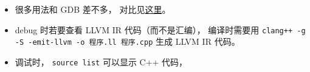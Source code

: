 
\begin{issues}
\issueDraft
\end{issues}


\begin{itemize}
\item 很多用法和 GDB 差不多， 对比见\href{https://lldb.llvm.org/use/map.html}{这里}。
\item debug 时若要查看 LLVM IR 代码（而不是汇编）， 编译时需要用 \verb|clang++ -g -S -emit-llvm -o 程序.ll 程序.cpp| 生成 LLVM IR 代码。
\item 调试时， \verb|source list| 可以显示 C++ 代码， 
\end{itemize}

